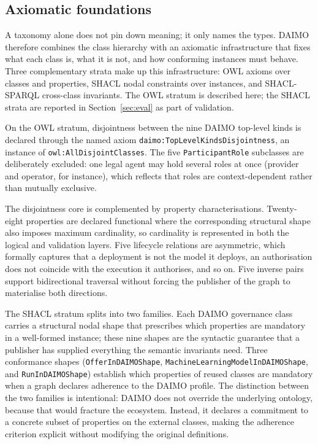\documentclass[Afour,sagev,times]{sagej}
\newcommand{\code}[1]{\texttt{#1}}
\begin{document}
\subsection{Axiomatic foundations}\label{sec:axiomatic}

A taxonomy alone does not pin down meaning; it only names the types. DAIMO therefore combines the class hierarchy with an axiomatic infrastructure that fixes what each class is, what it is not, and how conforming instances must behave. Three complementary strata make up this infrastructure: OWL axioms over classes and properties, SHACL nodal constraints over instances, and SHACL-SPARQL cross-class invariants. The OWL stratum is described here; the SHACL strata are reported in Section~\ref{sec:eval} as part of validation.

On the OWL stratum, disjointness between the nine DAIMO top-level kinds is declared through the named axiom \code{daimo:TopLevelKindsDisjointness}, an instance of \code{owl:AllDisjointClasses}. The five \code{ParticipantRole} subclasses are deliberately excluded: one legal agent may hold several roles at once (provider and operator, for instance), which reflects that roles are context-dependent rather than mutually exclusive.

The disjointness core is complemented by property characterisations. Twenty-eight properties are declared functional where the corresponding structural shape also imposes maximum cardinality, so cardinality is represented in both the logical and validation layers. Five lifecycle relations are asymmetric, which formally captures that a deployment is not the model it deploys, an authorisation does not coincide with the execution it authorises, and so on. Five inverse pairs support bidirectional traversal without forcing the publisher of the graph to materialise both directions.

The SHACL stratum splits into two families. Each DAIMO governance class carries a structural nodal shape that prescribes which properties are mandatory in a well-formed instance; these nine shapes are the syntactic guarantee that a publisher has supplied everything the semantic invariants need. Three conformance shapes (\code{OfferInDAIMOShape}, \code{MachineLearningModelInDAIMOShape}, and \code{RunInDAIMOShape}) establish which properties of reused classes are mandatory when a graph declares adherence to the DAIMO profile. The distinction between the two families is intentional: DAIMO does not override the underlying ontology, because that would fracture the ecosystem. Instead, it declares a commitment to a concrete subset of properties on the external classes, making the adherence criterion explicit without modifying the original definitions.
\end{document}
